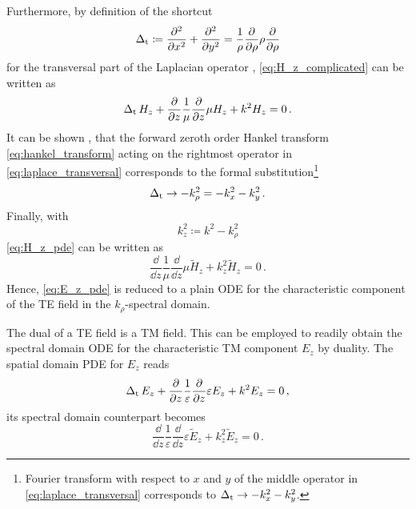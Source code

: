 Furthermore, by definition of the shortcut
\begin{equation}\label{eq:laplace_transversal}
	\operatorname{\operatorname{\Delta}_\mathrm{t}}
	\coloneqq
	\frac{\partial^2}{\partial x^2} +
	\frac{\partial^2}{\partial y^2}
	=
	\frac{1}{\rho}
	\frac{\partial}{\partial \rho}
	\rho
	\frac{\partial}{\partial \rho}
\end{equation}
for the transversal part of the Laplacian operator \cite[731]{Bronstein2016},
\eqref{eq:H_z_complicated} can be written as 
\begin{equation}\label{eq:H_z_pde}
	\operatorname{\operatorname{\Delta}_\mathrm{t}} H_z +
	\frac{\partial}{\partial z}
	\frac{1}{\mu}
	\frac{\partial}{\partial z}
	\mu H_z +
	k^2 H_z = 0
	\,.
\end{equation}
It can be shown \cite[231]{Davies2002}, that the forward zeroth order Hankel
transform \eqref{eq:hankel_transform} acting on the rightmost operator in
\eqref{eq:laplace_transversal} corresponds to the formal
substitution\footnote{Fourier transform with respect to $x$ and $y$ of the
middle operator in \eqref{eq:laplace_transversal} corresponds to
$\operatorname{\operatorname{\Delta}_\mathrm{t}} \to - k_x^2 - k_y^2$.}
\cite{Michalski2016b}
\begin{equation}
	\operatorname{\operatorname{\Delta}_\mathrm{t}} \to -k_\rho^2 = - k_x^2 - k_y^2
	\,.
\end{equation}
Finally, with
\begin{equation}\label{eq:k_z_square}
	k_z^2 \coloneqq k^2 - k_\rho^2
\end{equation}
\eqref{eq:H_z_pde} can be written as
\begin{equation}\label{eq:TE_ODE}
	\frac{\dd}{\dd z}
	\frac{1}{\mu}
	\frac{\dd}{\dd z}
	\mu \tilde{H}_z +
	k_z^2 \tilde{H}_z = 0
	\, .
\end{equation}
Hence, \eqref{eq:E_z_pde} is reduced to a plain \ac{ODE} for the characteristic
component of the \ac{TE} field in the $k_\rho$-spectral domain.

The dual of a \ac{TE} field is a \ac{TM} field.
This can be employed to readily obtain the spectral domain \ac{ODE} for the
characteristic \ac{TM} component $E_z$ by duality.
The spatial domain \ac{PDE} for $E_z$ reads
\begin{equation}\label{eq:E_z_pde}
	\operatorname{\operatorname{\Delta}_\mathrm{t}} E_z +
	\frac{\partial}{\partial z}
	\frac{1}{\varepsilon}
	\frac{\partial}{\partial z}
	\varepsilon E_z + 
	k^2 E_z = 0
	\,,
\end{equation}
its spectral domain counterpart becomes
\begin{equation}\label{eq:TM_ODE}
	\frac{\dd}{\dd z}
	\frac{1}{\varepsilon}
	\frac{\dd}{\dd z}
	\varepsilon \tilde{E}_z + 
	k_z^2 \tilde{E}_z = 0 \,.
\end{equation}

